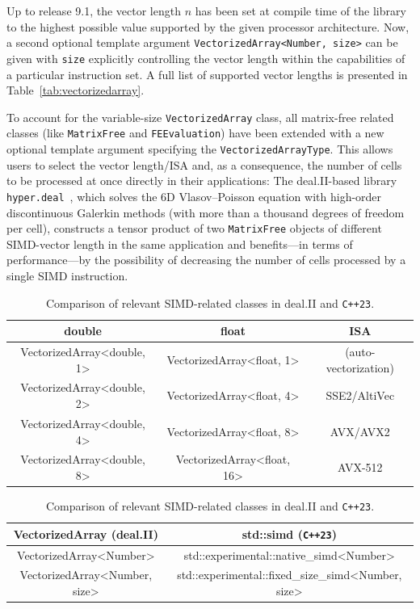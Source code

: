 \documentclass{ansarticle-preprint}
\begin{document}
Up to release 9.1, the
vector length $n$ has been set at compile time of the library to the highest
possible value supported by the given processor architecture.
Now, a second optional template argument
\texttt{VectorizedArray<Number, size>} can be given with \texttt{size} explicitly controlling
the vector length within the capabilities of a particular instruction set.
A full list of supported
vector lengths is presented in Table~\ref{tab:vectorizedarray}.

To account for the variable-size \texttt{VectorizedArray} class, all matrix-free related classes (like \texttt{MatrixFree} and \texttt{FEEvaluation})
have been extended with a new optional template argument specifying the
\texttt{VectorizedArrayType}. This allows users to select the vector length/ISA and,
as a consequence, the number of cells to be processed at once directly in their applications:
The deal.II-based
library \texttt{hyper.deal}~\cite{munch2020hyperdeal}, which solves the 6D Vlasov--Poisson equation with high-order
discontinuous Galerkin methods (with more than a thousand degrees of freedom per cell), constructs a tensor product of two \texttt{MatrixFree} objects of different SIMD-vector
length in the same application and benefits---in terms of performance---by the possibility of decreasing the number of cells processed by a single SIMD instruction.


\begin{table}
\caption{Supported vector lengths of the class \texttt{VectorizedArray} and
the corresponding instruction-set-architecture extensions. }\label{tab:vectorizedarray}
\centering
\begin{tabular}{ccc}
\toprule
\textbf{double} & \textbf{float} & \textbf{ISA}\\
\midrule
VectorizedArray<double, 1> & VectorizedArray<float, 1> & (auto-vectorization) \\
VectorizedArray<double, 2> & VectorizedArray<float, 4> & SSE2/AltiVec \\
VectorizedArray<double, 4> & VectorizedArray<float, 8> & AVX/AVX2 \\
VectorizedArray<double, 8> & VectorizedArray<float, 16> & AVX-512 \\
\bottomrule
\end{tabular}

\caption{Comparison of relevant SIMD-related classes in deal.II and \texttt{C++23}.}\label{tab:simd}
\centering
\begin{tabular}{cc}
\toprule
\textbf{VectorizedArray (deal.II)} & \textbf{std::simd (\texttt{C++23})} \\
\midrule
VectorizedArray<Number> & std::experimental::native\_simd<Number> \\
VectorizedArray<Number, size> & std::experimental::fixed\_size\_simd<Number, size> \\ \bottomrule
\end{tabular}
\end{table}
\end{document}
